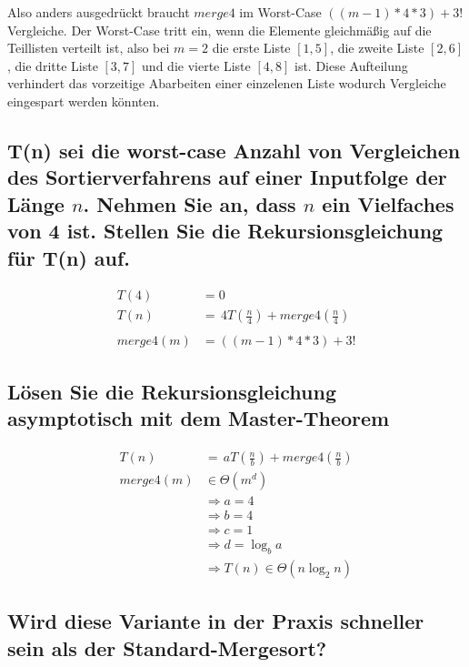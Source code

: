 \documentclass{article}
\begin{document}
Also anders ausgedrückt braucht $merge4$ im Worst-Case $((m - 1) * 4 * 3) + 3!$ Vergleiche.
Der Worst-Case tritt ein, wenn die Elemente gleichmäßig auf die Teillisten verteilt ist, also
bei $m = 2$ die erste Liste $[1, 5]$, die zweite Liste $[2, 6]$, die dritte Liste $[3, 7]$
und die vierte Liste $[4, 8]$ ist. Diese Aufteilung verhindert das vorzeitige Abarbeiten
einer einzelenen Liste wodurch Vergleiche eingespart werden könnten.

\subsection{T(n) sei die worst-case Anzahl von Vergleichen des Sortierverfahrens auf
einer Inputfolge der Länge $n$. Nehmen Sie an, dass $n$ ein Vielfaches von 4 ist.
Stellen Sie die Rekursionsgleichung für T(n) auf.}

\begin{align*}
	         T(4) & = 0                                        \\
	         T(n) & = \, 4T(\frac{n}{4}) + merge4(\frac{n}{4}) \\
	\\
	    merge4(m) & = ((m - 1) * 4 * 3) + 3!
\end{align*}

\subsection{Lösen Sie die Rekursionsgleichung asymptotisch mit dem Master-Theorem}

\begin{align*}
	         T(n) & = \, aT(\frac{n}{b}) + merge4(\frac{n}{b}) \\
		merge4(m) & \in \Theta(m^d)                            \\
				  & \Rightarrow a = 4                          \\
				  & \Rightarrow b = 4                          \\
				  & \Rightarrow c = 1                          \\
				  & \Rightarrow d = \log_b a                   \\
				  & \Rightarrow T(n) \in \Theta(n \log_2 n)
\end{align*}


\subsection{Wird diese Variante in der Praxis schneller sein als der Standard-Mergesort?}
\end{document}
